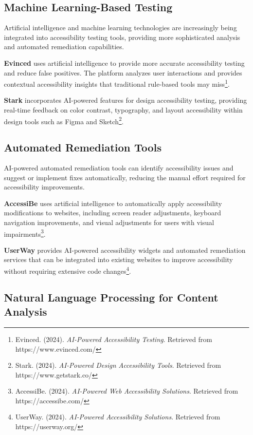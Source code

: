 \subsection{Machine Learning-Based Testing}

Artificial intelligence and machine learning technologies are increasingly being integrated into accessibility testing tools, providing more sophisticated analysis and automated remediation capabilities.

\textbf{Evinced} uses artificial intelligence to provide more accurate accessibility testing and reduce false positives. The platform analyzes user interactions and provides contextual accessibility insights that traditional rule-based tools may miss\footnote{Evinced. (2024). \textit{AI-Powered Accessibility Testing}. Retrieved from https://www.evinced.com/}.

\textbf{Stark} incorporates AI-powered features for design accessibility testing, providing real-time feedback on color contrast, typography, and layout accessibility within design tools such as Figma and Sketch\footnote{Stark. (2024). \textit{AI-Powered Design Accessibility Tools}. Retrieved from https://www.getstark.co/}.

\subsection{Automated Remediation Tools}

AI-powered automated remediation tools can identify accessibility issues and suggest or implement fixes automatically, reducing the manual effort required for accessibility improvements.

\textbf{AccessiBe} uses artificial intelligence to automatically apply accessibility modifications to websites, including screen reader adjustments, keyboard navigation improvements, and visual adjustments for users with visual impairments\footnote{AccessiBe. (2024). \textit{AI-Powered Web Accessibility Solutions}. Retrieved from https://accessibe.com/}.

\textbf{UserWay} provides AI-powered accessibility widgets and automated remediation services that can be integrated into existing websites to improve accessibility without requiring extensive code changes\footnote{UserWay. (2024). \textit{AI-Powered Accessibility Solutions}. Retrieved from https://userway.org/}.

\subsection{Natural Language Processing for Content Analysis}

